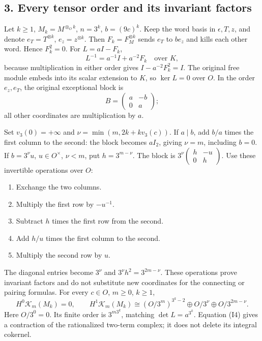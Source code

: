 \documentclass[
  10pt,
]{article}
\providecommand{\tightlist}{%
  \setlength{\itemsep}{0pt}\setlength{\parskip}{0pt}}
\begin{document}
\subsection{3. Every tensor order and its invariant
factors}\label{every-tensor-order-and-its-invariant-factors}

Let \(k\ge1\), \(M_k=M^{\otimes_O k}\), \(n=3^k\), \(b=(9c)^k\). Keep
the word basis in \(\epsilon,T,z\), and denote \(e_T=T^{\otimes k}\),
\(e_z=z^{\otimes k}\). Then \(F_k=F_M^{\otimes k}\) sends \(e_T\) to
\(be_z\) and kills each other word. Hence \(F_k^2=0\). For \(L=aI-F_k\),
\[
L^{-1}=a^{-1}I+a^{-2}F_k\quad\text{over }K, \tag{I4}
\] because multiplication in either order gives \(I-a^{-2}F_k^2=I\). The
original free module embeds into its scalar extension to \(K\), so
\(\ker L=0\) over \(O\). In the order \(e_z,e_T\), the original
exceptional block is \[
B=\begin{pmatrix}a&-b\\0&a\end{pmatrix}; \tag{I5}
\] all other coordinates are multiplication by \(a\).

Set \(v_3(0)=+\infty\) and \(\nu=\min(m,2k+kv_3(c))\). If \(a\mid b\),
add \(b/a\) times the first column to the second: the block becomes
\(aI_2\), giving \(\nu=m\), including \(b=0\). If \(b=3^\nu u\),
\(u\in O^\times\), \(\nu<m\), put \(h=3^{m-\nu}\). The block is
\(3^\nu\left(\begin{smallmatrix}h&-u\\0&h\end{smallmatrix}\right)\). Use
these invertible operations over \(O\):

\begin{enumerate}
\def\labelenumi{\arabic{enumi}.}
\tightlist
\item
  Exchange the two columns.
\item
  Multiply the first row by \(-u^{-1}\).
\item
  Subtract \(h\) times the first row from the second.
\item
  Add \(h/u\) times the first column to the second.
\item
  Multiply the second row by \(u\).
\end{enumerate}

The diagonal entries become \(3^\nu\) and \(3^\nu h^2=3^{2m-\nu}\).
These operations prove invariant factors and do not substitute new
coordinates for the connecting or pairing formulas. For every
\(c\in O\), \(m\ge0\), \(k\ge1\), \[
H^0\mathcal K_m(M_k)=0,\qquad
H^1\mathcal K_m(M_k)\cong
(O/3^m)^{3^k-2}\oplus O/3^\nu\oplus O/3^{2m-\nu}. \tag{I6}
\] Here \(O/3^0=0\). Its finite order is \(3^{m3^k}\), matching
\(\det L=a^{3^k}\). Equation (I4) gives a contraction of the
rationalized two-term complex; it does not delete its integral cokernel.
\end{document}
